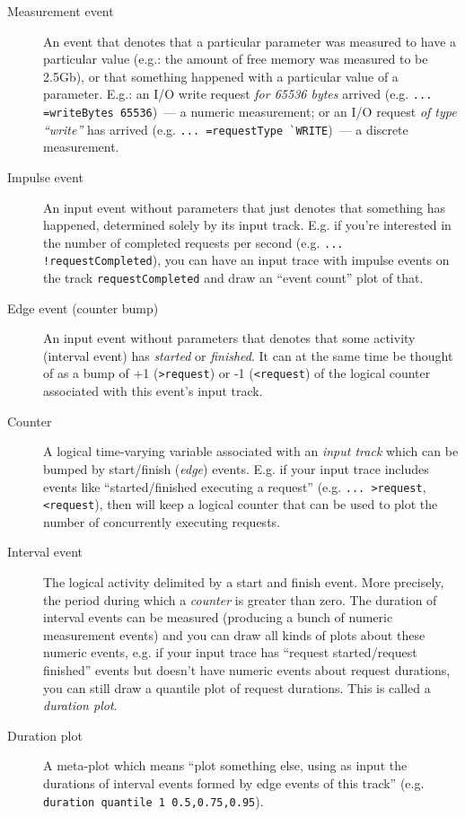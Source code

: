\documentclass{article}
\begin{document}
\begin{description}
\item[Measurement event] An event that denotes that a particular parameter was measured to have a particular value (e.g.: the amount of free memory was measured to be 2.5Gb), or that something happened with a particular value of a parameter. E.g.: an I/O write request \emph{for 65536 bytes} arrived (e.g. \verb|... =writeBytes 65536|)~--- a numeric measurement; or an I/O request \emph{of type ``write''} has arrived (e.g. \verb|... =requestType `WRITE|)~--- a discrete measurement.
\item[Impulse event] An input event without parameters that just denotes that something has happened, determined solely by its input track. E.g. if you're interested in the number of completed requests per second (e.g. \verb|... !requestCompleted|), you can have an input trace with impulse events on the track \verb|requestCompleted| and draw an ``event count'' plot of that.
\item[Edge event (counter bump)] An input event without parameters that denotes that some activity (interval event) has \emph{started} or \emph{finished}. It can at the same time be thought of as a bump of +1 (\verb|>request|) or -1 (\verb|<request|) of the logical counter associated with this event's input track.
\item[Counter] A logical time-varying variable associated with an \emph{input track} which can be bumped by start/finish (\emph{edge}) events. E.g. if your input trace includes events like ``started/finished executing a request'' (e.g. \verb|... >request|, \verb|<request|), then \timeplot{} will keep a logical counter that can be used to plot the number of concurrently executing requests.
\item[Interval event] The logical activity delimited by a start and finish event. More precisely, the period during which a \emph{counter} is greater than zero. The duration of interval events can be measured (producing a bunch of numeric measurement events) and you can draw all kinds of plots about these numeric events, e.g. if your input trace has ``request started/request finished'' events but doesn't have numeric events about request durations, you can still draw a quantile plot of request durations. This is called a \emph{duration plot}.
\item[Duration plot] A meta-plot which means ``plot something else, using as input the durations of interval events formed by edge events of this track'' (e.g. \verb|duration quantile 1 0.5,0.75,0.95|).
\end{description}
\end{document}
